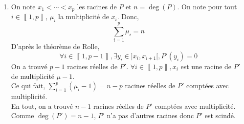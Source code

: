 \begin{exo}
\begin{enumerate}
\begin{minipage}{\linewidth}
\begin{wrapfigure}
\begin{asy}
						for(real droot: droots) {
							real y = f(droot);
							draw((droot - eps, y) -- (droot + eps, y), red, Arrows(TeXHead));
						}
					\end{asy}
				\end{wrapfigure}
				Soit $P \in \R[X]$ avec $\deg(P) = n$ scindé sur $\R$.\\
				On note $x_1< x_2< \cdots< x_n$ les $n$ racines de $P$\\
				Soit  $f_P: \R \to \R$ la fonction polynomiale. Aussi, $f_P$ est $\mathcal{C}^{\infty}$ sur $\R$.\\
				D'après le théorème de Rolle, \[
					\forall i \in \left\llbracket 1, n-1 \right\rrbracket, \exists y_i \in ]x_i, x_{i+1}[,
					f'_P(y_i) = 0
				\] Donc $y_1, \ldots, y_{n-1}$ sont racines de $P'$.\\
				De plus, \[
					y_1 < x_2 < y_2 < x_3 < y_3 < \cdots < y_{n-1}
				\] On a donc trouvé $n-1$ racines distinctes de $P'$. Or, $\deg(P') = n-1$.\\
				Donc, on a trouvé TOUTES les racines complexes de  $P'$. Donc $P'$ est sciendé à racines simples.\\
			\end{minipage}
		\item On note $x_1 < \cdots < x_p$ les racines de $P$ et $n = \deg(P)$. On note pour tout $i \in \left\llbracket 1,p \right\rrbracket$, $\mu_i$ la multiplicité de $x_i$. Donc, \[
			\sum_{i=1}^p \mu_i = n
		\] D'après le théorème de Rolle, \[
			\forall i \in \left\llbracket 1,p-1 \right\rrbracket, \exists y_i \in ]x_i, x_{i+1}[, P'(y_i) = 0
		\] On a trouvé $p-1$ racines réelles de $P'$.
		$\forall i \in \left\llbracket 1, p \right\rrbracket, x_i$ est une racine de $P'$ de multiplicité $\mu-1$.\\
		Ce qui fait, $\sum_{i=1}^p (\mu_i - 1) = n - p$ racines réelles de $P'$ comptées avec multiplicité.\\
		En tout, on a trouvé $n-1$ racines réelles de $P'$ comptées avec multiplicité.\\
		Comme $\deg(P') = n - 1$, $P'$ n'a pas d'autres racines donc $P'$ est scindé.
	\end{enumerate}
\end{exo}

